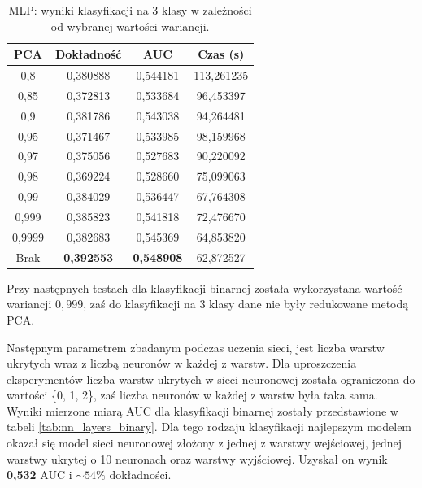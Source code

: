 \documentclass[a4paper, twoside, 11pt, openright]{article}
\begin{document}
\begin{table}[H]
    \centering
    \begin{tabular}{|c|c|c|c|}
    \hline
        \textbf{PCA} & \textbf{Dokładność} &  \textbf{AUC} &  \textbf{Czas (s)} \\ \hline
0,8                &  0,380888 &  0,544181 &  113,261235 \\ \hline
0,85               &  0,372813 &  0,533684 &   96,453397 \\ \hline
0,9                &  0,381786 &  0,543038 &   94,264481 \\ \hline
0,95               &  0,371467 &  0,533985 &   98,159968 \\ \hline
0,97               &  0,375056 &  0,527683 &   90,220092 \\ \hline
0,98               &  0,369224 &  0,528660 &   75,099063 \\ \hline
0,99               &  0,384029 &  0,536447 &   67,764308 \\ \hline
0,999              &  0,385823 &  0,541818 &   72,476670 \\ \hline
0,9999             &  0,382683 &  0,545369 &   64,853820 \\ \hline
Brak                &  \textbf{0,392553} &  \textbf{0,548908} &   62,872527 \\ \hline
    \end{tabular}
    \caption{MLP: wyniki klasyfikacji na 3 klasy w zależności od wybranej wartości wariancji.}
    \label{tab:nn_pca_discrete}
\end{table}

Przy następnych testach dla klasyfikacji binarnej została wykorzystana wartość wariancji $0,999$, zaś do klasyfikacji na 3 klasy dane nie były redukowane metodą PCA.

\bigskip

Następnym parametrem zbadanym podczas uczenia sieci, jest liczba warstw ukrytych wraz z liczbą neuronów w każdej z warstw. Dla uproszczenia eksperymentów liczba warstw ukrytych w sieci neuronowej została ograniczona do wartości \{0, 1, 2\}, zaś liczba neuronów w każdej z warstw była taka sama. Wyniki mierzone miarą AUC dla klasyfikacji binarnej zostały przedstawione w tabeli \ref{tab:nn_layers_binary}. Dla tego rodzaju klasyfikacji najlepszym modelem okazał się model sieci neuronowej złożony z jednej z warstwy wejściowej, jednej warstwy ukrytej o 10 neuronach oraz warstwy wyjściowej. Uzyskał on wynik \textbf{0,532} AUC i $\sim 54\%$ dokładności.
\end{document}
